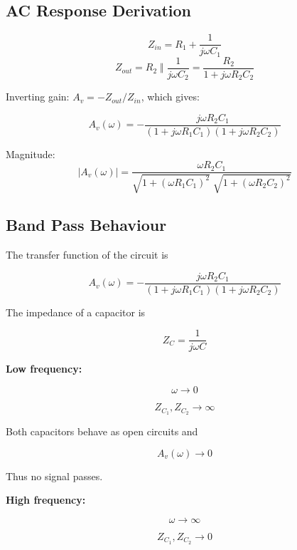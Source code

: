 \documentclass[10pt,twocolumn]{article}
\begin{document}
\subsection{AC Response Derivation}

\begin{equation}
    Z_{in} = R_1 + \frac{1}{j\omega C_1}
\end{equation}
\begin{equation}
    Z_{out} = R_2 \;\Big\Vert\; \frac{1}{j\omega C_2}
            = \frac{R_2}{1 + j\omega R_2 C_2}
\end{equation}

Inverting gain: $A_v = -Z_{out}/Z_{in}$, which gives:

\begin{equation}
    \boxed{A_v(\omega) = -\frac{j\omega R_2 C_1}{\left(1+j\omega R_1 C_1\right)
    \left(1+j\omega R_2 C_2\right)}}
    \label{eq:bpf_tf}
\end{equation}


Magnitude:
\begin{equation}
    |A_v(\omega)| = \frac{\omega R_2 C_1}
    {\sqrt{1+(\omega R_1 C_1)^2}\;\sqrt{1+(\omega R_2 C_2)^2}}
\end{equation}
\subsection{Band Pass Behaviour}

The transfer function of the circuit is

\begin{equation}
A_v(\omega) =
-\frac{j\omega R_2 C_1}
{(1+j\omega R_1 C_1)(1+j\omega R_2 C_2)}
\end{equation}

The impedance of a capacitor is

\[
Z_C = \frac{1}{j\omega C}
\]

\textbf{Low frequency:}

\[
\omega \rightarrow 0
\]

\[
Z_{C_1}, Z_{C_2} \rightarrow \infty
\]

Both capacitors behave as open circuits and

\[
A_v(\omega) \rightarrow 0
\]

Thus no signal passes.

\textbf{High frequency:}

\[
\omega \rightarrow \infty
\]

\[
Z_{C_1}, Z_{C_2} \rightarrow 0
\]
\end{document}
